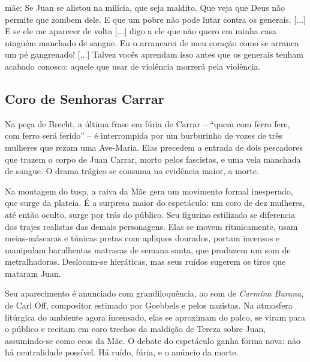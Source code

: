 
{\sc mãe}: Se Juan se alistou na milícia, que seja maldito. Que veja que Deus
não permite que zombem dele. E que um pobre não pode lutar contra os
generais. {[}...{]} E se ele me aparecer de volta {[}...{]} digo a ele
que não quero em minha casa ninguém manchado de sangue. Eu o arrancarei
de meu coração como se arranca um pé gangrenado! {[}...{]} Talvez vocês
aprendam isso antes que os generais tenham acabado conosco: aquele que
usar de violência morrerá pela violência.


\subsection{Coro de Senhoras Carrar}

Na peça de Brecht, a última frase em fúria de Carrar -- “quem com ferro
fere, com ferro será ferido” -- é interrompida por um burburinho de vozes
de três mulheres que rezam uma Ave-Maria. Elas precedem a entrada de
dois pescadores que trazem o corpo de Juan Carrar, morto pelos
fascistas, e uma vela manchada de sangue. O drama trágico se consuma na
evidência maior, a morte.

Na montagem do {\sc tusp}, a raiva da Mãe gera um movimento formal inesperado,
que surge da plateia. É a surpresa maior do espetáculo: um coro de dez
mulheres, até então oculto, surge por trás do público. Seu figurino
estilizado se diferencia dos trajes realistas das demais personagens.
Elas se movem ritmicamente, usam meias-máscaras e túnicas pretas com
apliques dourados, portam incensos e manipulam barulhentas matracas de
semana santa, que produzem um som de metralhadoras. Deslocam-se
hieráticas, mas seus ruídos sugerem os tiros que mataram Juan.

Seu aparecimento é anunciado com grandiloquência, ao som de {\it Carmina
Burana}, de Carl Off, compositor estimado por Goebbels e pelos nazistas.
Na atmosfera litúrgica do ambiente agora incensado, elas se aproximam do
palco, se viram para o público e recitam em coro trechos da maldição de
Tereza sobre Juan, assumindo-se como ecos da Mãe. O debate do espetáculo
ganha forma nova: não há neutralidade possível. Há ruído, fúria, e o
anúncio da morte.

